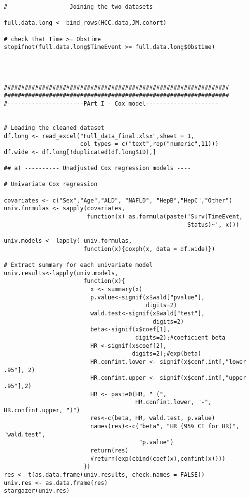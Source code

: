 \documentclass[11pt,twoside]{article}
\numberwithin{Theorem}{section}
\numberwithin{Definition}{section}
\numberwithin{Lemma}{section}
\numberwithin{Algorithm}{section}
\numberwithin{equation}{section}
\begin{document}
\begin{lstlisting}
#------------------Joining the two datasets ---------------

full.data.long <- bind_rows(HCC.data,JM.cohort)

# check that Time >= Obstime
stopifnot(full.data.long$TimeEvent >= full.data.long$Obstime)




#################################################################
#################################################################
#----------------------PArt I - Cox model---------------------


# Loading the cleaned dataset
df.long <- read_excel("Full_data_final.xlsx",sheet = 1,
                      col_types = c("text",rep("numeric",11)))
df.wide <- df.long[!duplicated(df.long$ID),]

## a) ---------- Unadjusted Cox regression models ----

# Univariate Cox regression

covariates <- c("Sex","Age","ALD", "NAFLD", "HepB","HepC","Other")
univ.formulas <- sapply(covariates,
                        function(x) as.formula(paste('Surv(TimeEvent,
                                                     Status)~', x)))

univ.models <- lapply( univ.formulas,
                       function(x){coxph(x, data = df.wide)})

# Extract summary for each univariate model
univ.results<-lapply(univ.models,
                       function(x){
                         x <- summary(x)
                         p.value<-signif(x$wald["pvalue"],
                                         digits=2)
                         wald.test<-signif(x$wald["test"],
                                           digits=2)
                         beta<-signif(x$coef[1],
                                      digits=2);#coeficient beta
                         HR <-signif(x$coef[2],
                                     digits=2);#exp(beta)
                         HR.confint.lower <- signif(x$conf.int[,"lower .95"], 2)
                         HR.confint.upper <- signif(x$conf.int[,"upper .95"],2)
                         HR <- paste0(HR, " (",
                                      HR.confint.lower, "-", HR.confint.upper, ")")
                         res<-c(beta, HR, wald.test, p.value)
                         names(res)<-c("beta", "HR (95% CI for HR)", "wald.test",
                                       "p.value")
                         return(res)
                         #return(exp(cbind(coef(x),confint(x))))
                       })
res <- t(as.data.frame(univ.results, check.names = FALSE))
univ.res <- as.data.frame(res)
stargazer(univ.res)


\end{lstlisting}
\end{document}
